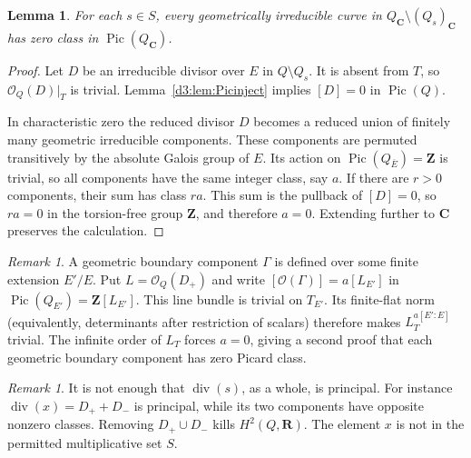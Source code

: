 \documentclass[11pt,a4paper]{amsart}
\numberwithin{equation}{section}
\newtheorem{lemma}[theorem]{Lemma}
\theoremstyle{definition}
\theoremstyle{remark}
\newtheorem{remark}[theorem]{Remark}
\newcommand{\Z}{\mathbf Z}
\newcommand{\R}{\mathbf R}
\newcommand{\C}{\mathbf C}
\newcommand{\OO}{\mathcal O}
\newcommand{\Pic}{\operatorname{Pic}}
\newcommand{\divisor}{\operatorname{div}}
\begin{document}
\begin{lemma}\label{d3:lem:components}
For each $s\in S$, every geometrically irreducible curve in $Q_{\C}\setminus(Q_s)_{\C}$ has zero class in $\Pic(Q_{\C})$.
\end{lemma}
\begin{proof}
Let $D$ be an irreducible divisor over $E$ in $Q\setminus Q_s$. It is absent from $T$, so $\OO_Q(D)|_T$ is trivial. Lemma~\ref{d3:lem:Picinject} implies $[D]=0$ in $\Pic(Q)$.

In characteristic zero the reduced divisor $D$ becomes a reduced union of finitely many geometric irreducible components. These components are permuted transitively by the absolute Galois group of $E$. Its action on $\Pic(Q_{\overline E})=\Z$ is trivial, so all components have the same integer class, say $a$. If there are $r>0$ components, their sum has class $ra$. This sum is the pullback of $[D]=0$, so $ra=0$ in the torsion-free group $\Z$, and therefore $a=0$. Extending further to $\C$ preserves the calculation.
\end{proof}

\begin{remark}
A geometric boundary component $\Gamma$ is defined over some finite
extension $E'/E$. Put $L=\OO_Q(D_+)$ and write
$[\OO(\Gamma)]=a[L_{E'}]$ in $\Pic(Q_{E'})=\Z[L_{E'}]$.
This line bundle is trivial on $T_{E'}$. Its finite-flat norm
(equivalently, determinants after restriction of scalars) therefore
makes $L_T^{a[E':E]}$ trivial. The infinite order of $L_T$ forces
$a=0$, giving a second proof that each geometric boundary component has zero Picard class.
\end{remark}

\begin{remark}
It is not enough that $\divisor(s)$, as a whole, is principal. For instance $\divisor(x)=D_++D_-$ is principal, while its two components have opposite nonzero classes. Removing $D_+\cup D_-$ kills $H^2(Q,\R)$. The element $x$ is not in the permitted multiplicative set $S$.
\end{remark}
\end{document}
